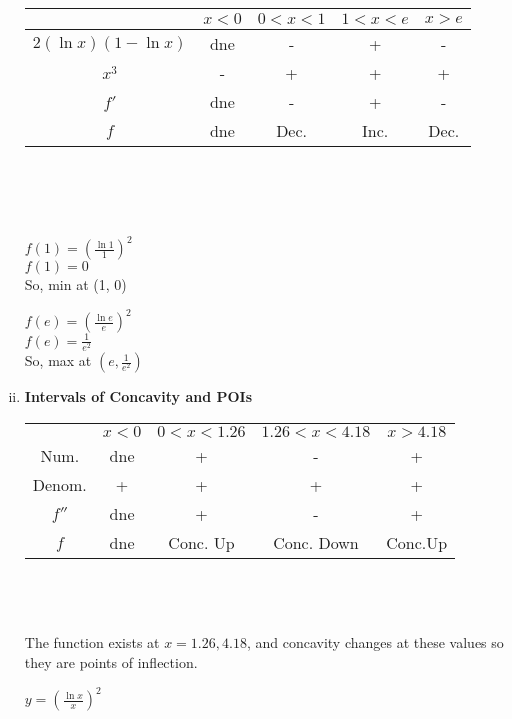 \documentclass{letter}
\begin{document}
\begin{minipage}[t]{0.5\textwidth}
\begin{enumerate}[i)]
			\begin{tabular}{c|c|c|c|c}
				&$x<0$&$0<x<1$&$1<x<e$&$x>e$\\
				\hline
				$2(\ln x)(1 - \ln x)$&dne&-&+&-\\
				$x^3$&-&+&+&+\\
				$f'$&dne&-&+&-\\
				$f$&dne&Dec.&Inc.&Dec.\\
			\end{tabular}\\
			\\\;\\
			\begin{minipage}[t]{0.45\textwidth}
				$f(1) = (\frac{\ln 1}{1})^2$\\
				$f(1) = 0$\\
				So, min at (1, 0)\\
			\end{minipage}
			\begin{minipage}[t]{0.45\textwidth}
				$f(e) = (\frac{\ln e}{e})^2$\\
				$f(e) = \frac{1}{e^2}$\\
				So, max at $(e, \frac{1}{e^2})$
			\end{minipage}
			\setcounter{enumi}{7}
			\item \textbf{Intervals of Concavity and POIs}	\\
			\begin{tabular}{c|c|c|c|c}
				&$x<0$&$0<x<1.26$&$1.26 < x < 4.18$&$x > 4.18$\\
				Num.&dne&+&-&+\\
				Denom.&+&+&+&+\\
				$f''$&dne&+&-&+\\
				$f$&dne&Conc. Up&Conc. Down&Conc.Up\\
			\end{tabular}
			\\\\\\
			The function exists at $x=1.26, 4.18$, and concavity changes at these values so they are points of inflection.\\
			\begin{center}$y = (\frac{\ln x}{x})^2$\end{center}
			\\
		\end{enumerate}
	\end{minipage}
\end{document}
